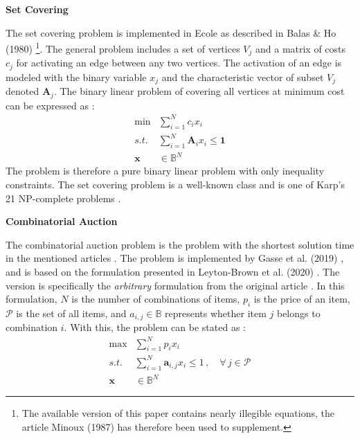 

\textbf{Set Covering}

The set covering problem is implemented in \gls{Ecole} as described in Balas \& Ho (1980) \cite{balas1980set} \footnote{The available version of this paper contains nearly illegible equations, the article Minoux (1987) \cite{minoux1987class} has therefore been used to supplement.}. The general problem includes a set of vertices $V_j$ and a matrix of costs $c_j$ for activating an edge between any two vertices. The activation of an edge is modeled with the binary variable $x_j$ and the characteristic vector of subset $V_j$ denoted $\textbf{A}_j$. The binary linear problem of covering all vertices at minimum cost can be expressed as \cite{minoux1987class}: 
\begin{align}
    \min &\sum_{i=1}^N c_i x_i \\ s.t. \; &\sum_{i=1}^N \mathbf{A}_i x_i \leq \mathbf{1} \\
    \mathbf{x} &\in \mathbb{B}^N 
\end{align}
The problem is therefore a pure binary linear problem with only inequality constraints. The set covering problem is a well-known class and is one of Karp's 21 \gls{NP}-complete problems \cite{karp1972reducibility}.  

\textbf{Combinatorial Auction}

The combinatorial auction problem is the problem with the shortest solution time in the mentioned articles \cite{gasse2019exact,gupta2020hybrid}. The problem is implemented by Gasse et al. (2019) \cite{gasse2019exact}, and is based on the formulation presented in Leyton-Brown et al. (2020) \cite{brown2000towards}. The version is specifically the \textit{arbitrary} formulation from the original article \cite{brown2000towards}. In this formulation, $N$ is the number of combinations of items, $p_i$ is the price of an item, $\mathcal{P}$ is the set of all items, and $a_{i,j} \in \mathbb{B}$ represents whether item $j$ belongs to combination $i$. With this, the problem can be stated as \cite{abrache2007combinatorial}:
\begin{align}
    \max &\sum_{i=1}^N p_i x_i \\ s.t. \; &\sum_{i=1}^N \mathbf{a}_{i,j} x_i \leq 1 \,, \quad \forall \, j \in \mathcal{P}\\ \mathbf{x} &\in \mathbb{B}^N 
\end{align}

